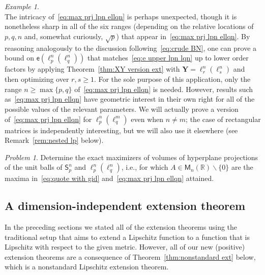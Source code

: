 \documentclass[11pt,reqno]{amsart}
\renewcommand{\ge}{\geqslant}
\renewcommand{\setminus}{\smallsetminus}
\newcommand{\Y}{\mathbf Y}
\newcommand{\R}{\mathbb R}
\theoremstyle{remark}
\newtheorem{example}[theorem]{Example}
\newtheorem{problem}[theorem]{Problem}
\newcommand{\M}{\mathsf{M}}
\newcommand{\sfS}{\mathsf{S}}
\newcommand{\ee}{\mathsf{e}}
\renewcommand{\1}{\mathbf 1}
\begin{document}
\begin{example}
\begin{equation}
\end{equation}
The  intricacy of~\eqref{eq:max prj lpn ellqn} is perhaps unexpected, though it is nonetheless sharp in all of the six ranges (depending on the relative locations of $p,q,n$ and, somewhat curiously, $\sqrt{p}$) that  appear in~\eqref{eq:max prj lpn ellqn}. By reasoning analogously to the discussion following~\eqref{eq:crude BN}, one can prove a bound on $\ee(\ell_p^n(\ell_q^n))$ that matches~\eqref{eq:e upper lpn lqn} up to lower order factors by applying Theorem~\ref{thm:XY version ext}  with $\Y=\ell_r^n(\ell_s^n)$ and then optimizing over $r,s\ge 1$.  For the sole purpose of this application, only the range $n\ge\max\{p,q\}$ of~\eqref{eq:max prj lpn ellqn} is needed. However, results such as~\eqref{eq:max prj lpn ellqn} have geometric interest in their own right for all of the possible values of the relevant parameters.  We will actually prove a version of~\eqref{eq:max prj lpn ellqn} for $\ell_p^n(\ell_q^m)$ even when $n\neq m$; the case of rectangular matrices is independently interesting, but  we will also use it elsewhere (see Remark~\ref{rem:nested lp} below).
\end{example}



\begin{problem} Determine the exact maximizers of volumes of hyperplane projections of the unit balls of $\sfS_p^n$ and $\ell_p^n(\ell_q^n)$, i.e., for which $A\in \M_n(\R)\setminus \{0\}$ are the maxima in~\eqref{eq:quote with gid} and~\eqref{eq:max prj lpn ellqn} attained.
\end{problem}


\subsection{A dimension-independent extension theorem}\label{sec:extension two metrics} In the preceding sections we stated all of the extension theorems using the traditional setup that aims to extend  a Lipschitz function to a function that is Lipschitz with respect to the given metric. However, all of our new (positive) extension theorems are a consequence of Theorem~\ref{thm:nonstandard ext} below, which is a nonstandard Lipschitz extension theorem.
\end{document}
